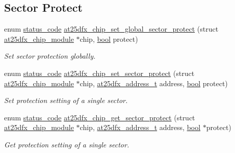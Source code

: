 \subsection*{Sector Protect}
\begin{DoxyCompactItemize}
\item 
enum \mbox{\hyperlink{group__group__sam0__utils__status__codes_ga751c892e5a46b8e7d282085a5a5bf151}{status\+\_\+code}} \mbox{\hyperlink{group__asfdoc__common2__at25dfx__group_gab9a4079fe6c6fee840cb296843d27500}{at25dfx\+\_\+chip\+\_\+set\+\_\+global\+\_\+sector\+\_\+protect}} (struct \mbox{\hyperlink{structat25dfx__chip__module}{at25dfx\+\_\+chip\+\_\+module}} $\ast$chip, \mbox{\hyperlink{group__group__sam0__utils_ga97a80ca1602ebf2303258971a2c938e2}{bool}} protect)
\begin{DoxyCompactList}\small\item\em Set sector protection globally. \end{DoxyCompactList}\item 
enum \mbox{\hyperlink{group__group__sam0__utils__status__codes_ga751c892e5a46b8e7d282085a5a5bf151}{status\+\_\+code}} \mbox{\hyperlink{group__asfdoc__common2__at25dfx__group_ga2c1adc1ecbcc27fbe88f5d57bfa0591c}{at25dfx\+\_\+chip\+\_\+set\+\_\+sector\+\_\+protect}} (struct \mbox{\hyperlink{structat25dfx__chip__module}{at25dfx\+\_\+chip\+\_\+module}} $\ast$chip, \mbox{\hyperlink{group__asfdoc__common2__at25dfx__group_ga6797a814b041014cef23de480c9da9ef}{at25dfx\+\_\+address\+\_\+t}} address, \mbox{\hyperlink{group__group__sam0__utils_ga97a80ca1602ebf2303258971a2c938e2}{bool}} protect)
\begin{DoxyCompactList}\small\item\em Set protection setting of a single sector. \end{DoxyCompactList}\item 
enum \mbox{\hyperlink{group__group__sam0__utils__status__codes_ga751c892e5a46b8e7d282085a5a5bf151}{status\+\_\+code}} \mbox{\hyperlink{group__asfdoc__common2__at25dfx__group_gaa811a5f0cad3fba016aef4ae128b8207}{at25dfx\+\_\+chip\+\_\+get\+\_\+sector\+\_\+protect}} (struct \mbox{\hyperlink{structat25dfx__chip__module}{at25dfx\+\_\+chip\+\_\+module}} $\ast$chip, \mbox{\hyperlink{group__asfdoc__common2__at25dfx__group_ga6797a814b041014cef23de480c9da9ef}{at25dfx\+\_\+address\+\_\+t}} address, \mbox{\hyperlink{group__group__sam0__utils_ga97a80ca1602ebf2303258971a2c938e2}{bool}} $\ast$protect)
\begin{DoxyCompactList}\small\item\em Get protection setting of a single sector. \end{DoxyCompactList}\end{DoxyCompactItemize}
